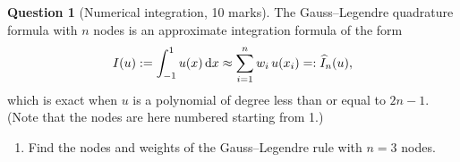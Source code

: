 \documentclass[11pt]{article}
\theoremstyle{definition}
\newtheorem{question}{Question}
\theoremstyle{remark}
\begin{document}
\newpage
\begin{question}
    [Numerical integration, 10 marks]
    The Gauss--Legendre quadrature formula with $n$ nodes is an approximate integration formula of the form
    \begin{equation}
        \label{gauss_legendre}
        I(u) := \int_{-1}^{1} u(x) \, \mathrm d x \approx \sum_{i=1}^{n} w_i \, u(x_i) =: \widehat I_n(u),
    \end{equation}
    which is exact when $u$ is a polynomial of degree less than or equal to $2n-1$.
    (Note that the nodes are here numbered starting from 1.)

    \begin{enumerate}
        \item
            Find the nodes and weights of the Gauss--Legendre rule with $n=3$ nodes.


\end{enumerate}
\end{question}
\end{document}
